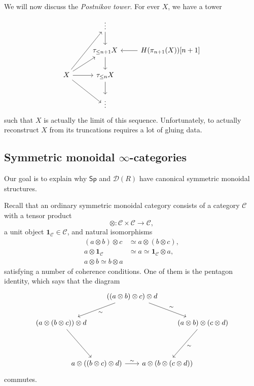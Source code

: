 \documentclass[10pt, oneside]{memoir}
\theoremstyle{definition}
\theoremstyle{remark}
\theoremstyle{plain}
\theoremstyle{definition}
\theoremstyle{remark}
\newcommand{\mc}[1]{\mathcal{#1}}
\newcommand{\ms}[1]{\mathsf{#1}}
\newcommand{\1}{\mathbf{1}}
\newcommand{\2}{\mathbf{2}}
\newcommand{\3}{\mathbf{3}}
\begin{document}
We will now discuss the \textit{Postnikov tower}. For ever \(X \), we have a tower
\begin{equation*}
\begin{tikzcd}
    & \vdots \ar{d} \\
    & \tau_{\leq n+1} X \ar{d} & H(\pi_{n+1}(X))[n+1] \ar{l} \\
    X \ar{uur} \ar{ur} \ar{r} \ar{dr} & \tau_{\leq n} X \ar{d} \\
    & \vdots
\end{tikzcd}
\end{equation*}
such that \(X \) is actually the limit of this sequence. Unfortunately, to actually reconstruct \(X \) from its truncations requires a lot of gluing data.


\subsection{\texorpdfstring{Symmetric monoidal \(\infty \)-categories}{Symmetric monoidal infinity-categories}}%
\label{sub:Symmetric monoidal infinity-categories}

Our goal is to explain why \(\ms{Sp} \) and \(\mc{D}(R) \) have canonical symmetric monoidal structures.

Recall that an ordinary symmetric monoidal category consists of a category \(\mc{C} \) with a tensor product
\[ \otimes \colon \mc{C} \times \mc{C} \to \mc{C}, \]
a unit object \(\1_{\mc{C}} \in \mc{C} \), and natural isomorphisms
\begin{align*}
    (a \otimes b) \otimes c &\simeq a \otimes (b \otimes c), \\
    a \otimes \1_{\mc{C}} &\simeq a \simeq \1_{\mc{C}} \otimes a, \\
    a \otimes b \simeq b \otimes a
\end{align*}
satisfying a number of coherence conditions. One of them is the pentagon identity, which says that the diagram
\begin{equation*}
\begin{tikzcd}[column sep=-3em, row sep=2em]
    & & ((a \otimes b) \otimes c) \otimes d \ar{drr}{\sim} \ar{dll}{\sim} & & \\
    (a \otimes (b \otimes c)) \otimes d \ar{ddr} & & & & (a \otimes b) \otimes (c \otimes d) \ar{ddl}{\sim} \\
    \\
    & a \otimes ((b \otimes c) \otimes d) \ar{rr}{\sim} & & a \otimes (b \otimes (c \otimes d))
\end{tikzcd}
\end{equation*}
commutes. 
\end{document}
